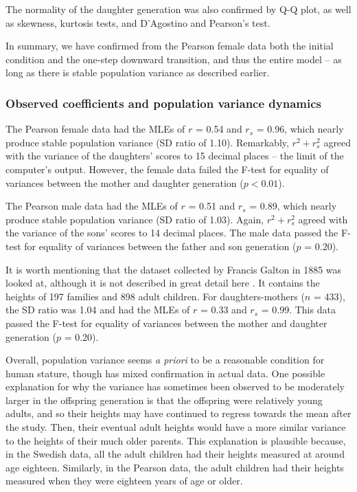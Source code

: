 \documentclass[letterpaper,10pt]{article} %
\begin{document}
The normality of the daughter generation was also confirmed by Q-Q plot, as well as skewness, kurtosis tests, and D’Agostino and Pearson's test.

In summary, we have confirmed from the Pearson female data both the initial condition and the one-step downward transition, and thus the entire model -- as long as there is stable population variance as described earlier. 


\subsubsection*{Observed coefficients and population variance dynamics}

The Pearson female data had the MLEs of $r$ = 0.54 and $r_s$ = 0.96, which nearly produce stable population variance (SD ratio of 1.10). Remarkably, $r^2 + r_s^2$ agreed with the variance of the daughters' scores to 15 decimal places -- the limit of the computer's output. However, the female data failed the F-test for equality of variances between the mother and daughter generation ($p < 0.01$). 

The Pearson male data had the MLEs of $r$ = 0.51 and $r_s$ = 0.89, which nearly produce stable population variance (SD ratio of 1.03). Again, $r^2 + r_s^2$ agreed with the variance of the sons' scores to 14 decimal places. The male data passed the F-test for equality of variances between the father and son generation ($p$ = 0.20). 

It is worth mentioning that the dataset collected by Francis Galton in 1885 was looked at, although it is not described in great detail here \cite{galton}. It contains the heights of 197 families and 898 adult children. For daughters-mothers ($n$ = 433), the SD ratio was 1.04 and had the MLEs of $r$ = 0.33 and $r_s$ = 0.99. This data passed the F-test for equality of variances between the mother and daughter generation ($p$ = 0.20). 

Overall, population variance seems \emph{a priori} to be a reasonable condition for human stature, though has mixed confirmation in actual data. One possible explanation for why the variance has sometimes been observed to be moderately larger in the offspring generation is that the offspring were relatively young adults, and so their heights may have continued to regress towards the mean after the study. Then, their eventual adult heights would have a more similar variance to the heights of their much older parents. This explanation is plausible because, in the Swedish data, all the adult children had their heights measured at around age eighteen. Similarly, in the Pearson data, the adult children had their heights measured when they were eighteen years of age or older. 
\end{document}
